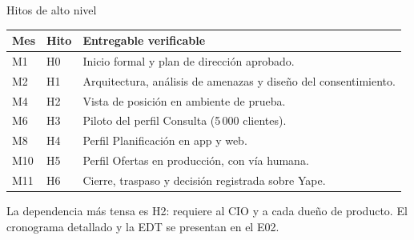 \documentclass[aspectratio=169,11pt]{beamer}
\begin{document}
\begin{frame}{Hitos de alto nivel}
\vspace{0.1cm}
\begin{center}
\small
\begin{tabular}{llp{9.5cm}}
\toprule
\textbf{Mes} & \textbf{Hito} & \textbf{Entregable verificable} \\
\midrule
M1  & H0 & Inicio formal y plan de dirección aprobado. \\
M2  & H1 & Arquitectura, análisis de amenazas y diseño del consentimiento. \\
M4  & H2 & Vista de posición en ambiente de prueba. \\
M6  & H3 & Piloto del perfil Consulta (5\,000 clientes). \\
M8  & H4 & Perfil Planificación en app y web. \\
M10 & H5 & Perfil Ofertas en producción, con vía humana. \\
M11 & H6 & Cierre, traspaso y decisión registrada sobre Yape. \\
\bottomrule
\end{tabular}
\end{center}
\vspace{0.25cm}
{\small La dependencia más tensa es H2: requiere al CIO y a cada dueño de producto. El cronograma detallado y la EDT se presentan en el E02.}
\end{frame}
\end{document}
